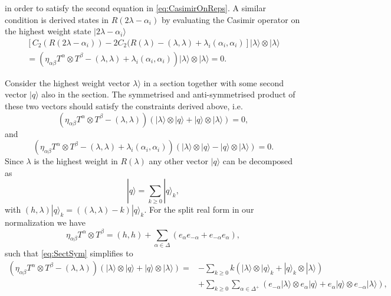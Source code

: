 in order to satisfy the second equation in \eqref{eq:CasimirOnReps}. A similar condition is derived states in $R(2\lambda-\alpha_i)$ by evaluating the Casimir operator on the highest weight state $|2\lambda-\alpha_i\rangle$
\begin{equation}
    \begin{aligned}
        \left[C_2(R(2\lambda-\alpha_i))-2C_2(R(\lambda)-(\lambda,\lambda)+\lambda_i(\alpha_i,\alpha_i)\right]|\lambda\rangle\otimes|\lambda\rangle\\
        =\left(\eta_{\alpha\beta}T^\alpha\otimes T^\beta-(\lambda,\lambda)+\lambda_i(\alpha_i,\alpha_i)\right)|\lambda\rangle\otimes|\lambda\rangle =0.
    \end{aligned}
\end{equation}

Consider the highest weight vector $\lambda\rangle$ in a section together with some second vector $|q\rangle$ also in the section. The symmetrised and anti-symmetrised product of these two vectors should satisfy the constraints derived above, i.e.\
\begin{equation}\label{eq:SectSym}
    \left(\eta_{\alpha\beta}T^\alpha\otimes T^\beta-(\lambda,\lambda)\right)\left(|\lambda\rangle\otimes|q\rangle+|q\rangle\otimes|\lambda\rangle\right)=0,
\end{equation}
and 
\begin{equation}
    \left(\eta_{\alpha\beta}T^\alpha\otimes T^\beta-(\lambda,\lambda)+\lambda_i(\alpha_i,\alpha_i)\right)\left(|\lambda\rangle\otimes|q\rangle-|q\rangle\otimes|\lambda\rangle\right)=0.
\end{equation}
Since $\lambda$ is the highest weight in $R(\lambda)$ any other vector $|q\rangle$ can be decomposed as 
\begin{equation}
    |q\rangle = \sum_{k\geq 0} |q\rangle_k,
\end{equation}
with $(h,\lambda)|q\rangle_k = ((\lambda,\lambda)-k)|q\rangle_k$. For the split real form in our normalization we have 
\begin{equation}
    \eta_{\alpha\beta}T^\alpha\otimes T^\beta = (h,h)+\sum_{\alpha\in\Delta}\left(e_\alpha e_{-\alpha}+e_{-\alpha}e_\alpha\right),
\end{equation}
such that \eqref{eq:SectSym} simplifies to 
\begin{equation}
    \begin{aligned}
    \left(\eta_{\alpha\beta}T^\alpha\otimes T^\beta-(\lambda,\lambda)\right)\left(|\lambda\rangle\otimes|q\rangle+|q\rangle\otimes|\lambda\rangle\right) =& -\sum_{k\geq 0} k\left(|\lambda\rangle\otimes|q\rangle_k+|q\rangle_k\otimes|\lambda\rangle\right)\\
    &+ \sum_{k\geq 0}\sum_{\alpha\in\Delta^+} \left(e_{-\alpha}|\lambda\rangle\otimes e_{\alpha}|q\rangle+e_{\alpha}|q\rangle\otimes e_{-\alpha}|\lambda\rangle\right),
    \end{aligned}
\end{equation}
